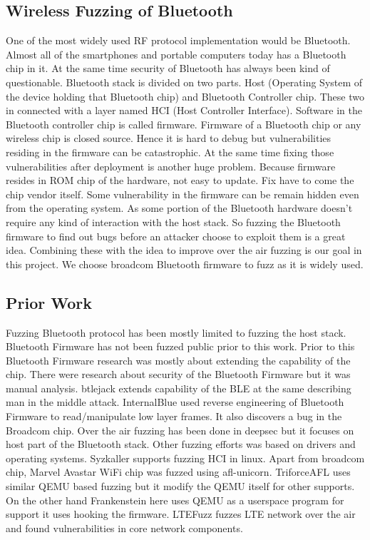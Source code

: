 \documentclass[letterpaper,11pt]{article}
\begin{document}
\subsection{Wireless Fuzzing of Bluetooth}
One of the most widely used RF protocol implementation would be Bluetooth. Almost all of the smartphones and portable computers today has a Bluetooth chip in it. At the same time security of Bluetooth has always been kind of questionable. Bluetooth stack is divided on two parts. Host (Operating System of the device holding that Bluetooth chip) and Bluetooth Controller chip. These two in connected with a layer named HCI (Host Controller Interface). Software in the Bluetooth controller chip is called firmware. Firmware of a Bluetooth chip or any wireless chip is closed source. Hence it is hard to debug but vulnerabilities residing in the firmware can be catastrophic. At the same time fixing those vulnerabilities after deployment is another huge problem. Because firmware resides in ROM chip of the hardware, not easy to update. Fix have to come the chip vendor itself. Some vulnerability in the firmware can be remain hidden even from the operating system. As some portion of the Bluetooth hardware doesn't require any kind of interaction with the host stack. So fuzzing the Bluetooth firmware to find out bugs before an attacker choose to exploit them is a great idea. Combining these with the idea to improve over the air fuzzing is our goal in this project. We choose broadcom Bluetooth firmware to fuzz as it is widely used.

\subsection{Prior Work}
Fuzzing Bluetooth protocol has been mostly limited to fuzzing the host stack. Bluetooth Firmware has not been fuzzed public prior to this work. Prior to this Bluetooth Firmware research was mostly about extending the capability of the chip. There were research about security of the Bluetooth Firmware but it was manual analysis. btlejack \cite{btlejack} extends capability of the BLE at the same describing man in the middle attack. InternalBlue \cite{DBLP:journals/corr/abs-1905-00631} used reverse engineering of Bluetooth Firmware to read/manipulate low layer frames. It also discovers a bug in the Broadcom chip.
Over the air fuzzing has been done in deepsec \cite{deepsec} but it focuses on host part of the Bluetooth stack. Other fuzzing efforts was based on drivers and operating systems. Syzkaller\cite{syzkaller} supports fuzzing HCI in linux. Apart from broadcom chip, Marvel Avastar\cite{marvel-avastar} WiFi chip was fuzzed using afl-unicorn\cite{afl-unicorn}. TriforceAFL\cite{TriforceAFL} uses similar QEMU based fuzzing but it modify the QEMU itself for other supports. On the other hand Frankenstein here uses QEMU as a userspace program for support it uses hooking the firmware. LTEFuzz \cite{8835363} fuzzes LTE network over the air and found vulnerabilities in core network components.  
\end{document}
